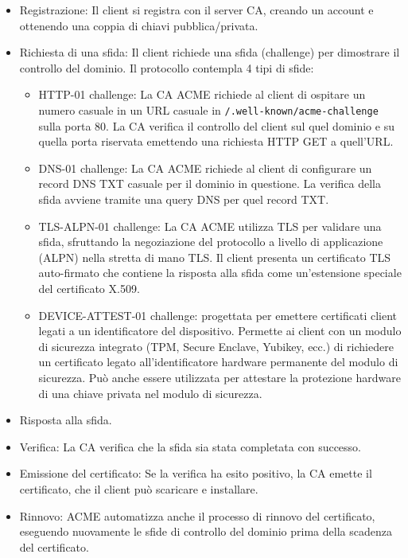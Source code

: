 \documentclass[12pt,a4paper]{report}
\begin{document}
\begin{itemize}
    \item Registrazione: Il client si registra con il server CA, creando un account e ottenendo una coppia di chiavi pubblica/privata.
    \item Richiesta di una sfida: Il client richiede una sfida (challenge) per dimostrare il controllo del dominio. Il protocollo contempla 4 tipi di sfide:
    \begin{itemize}
        \item HTTP-01 challenge: La CA ACME richiede al client di ospitare un numero casuale in un URL casuale in \texttt{/.well-known/acme-challenge} sulla porta 80. La CA verifica il controllo del client sul quel dominio e su quella porta riservata emettendo una richiesta HTTP GET a quell'URL.
        \item DNS-01 challenge: La CA ACME richiede al client di configurare un record DNS TXT casuale per il dominio in questione. La verifica della sfida avviene tramite una query DNS per quel record TXT.
        \item TLS-ALPN-01 challenge: La CA ACME utilizza TLS per validare una sfida, sfruttando la negoziazione del protocollo a livello di applicazione (ALPN) nella stretta di mano TLS. Il client presenta un certificato TLS auto-firmato che contiene la risposta alla sfida come un'estensione speciale del certificato X.509.
        \item DEVICE-ATTEST-01 challenge: progettata per emettere certificati client legati a un identificatore del dispositivo. Permette ai client con un modulo di sicurezza integrato (TPM, Secure Enclave, Yubikey, ecc.) di richiedere un certificato legato all'identificatore hardware permanente del modulo di sicurezza. Può anche essere utilizzata per attestare la protezione hardware di una chiave privata nel modulo di sicurezza.
    \end{itemize}
    \item Risposta alla sfida.
    \item Verifica: La CA verifica che la sfida sia stata completata con successo.
    \item Emissione del certificato: Se la verifica ha esito positivo, la CA emette il certificato, che il client può scaricare e installare.
    \item Rinnovo: ACME automatizza anche il processo di rinnovo del certificato, eseguendo nuovamente le sfide di controllo del dominio prima della scadenza del certificato.
\end{itemize}
\end{document}
